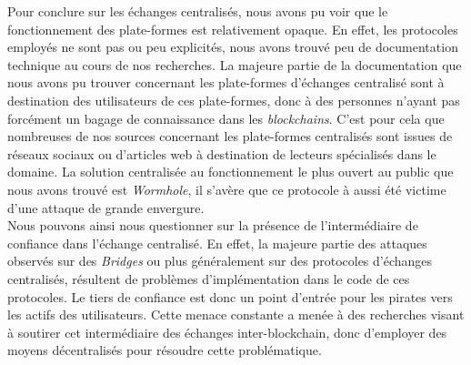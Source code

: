 Pour conclure sur les échanges centralisés, nous avons pu voir que le fonctionnement des plate-formes est relativement opaque. 
En effet, les protocoles employés ne sont pas ou peu explicités, nous avons trouvé peu de documentation technique au cours de nos recherches. 
La majeure partie de la documentation que nous avons pu trouver concernant les plate-formes d'échanges centralisé sont à destination des utilisateurs de ces plate-formes, donc à des personnes n'ayant pas forcément un bagage de connaissance dans les \textit{\gls{blockchain}s}. 
C'est pour cela que nombreuses de nos sources concernant les plate-formes centralisés sont issues de réseaux sociaux ou d'articles web à destination de lecteurs spécialisés dans le domaine. 
La solution centralisée au fonctionnement le plus ouvert au public que nous avons trouvé est \textit{\gls{Wormhole}}, il s'avère que ce protocole à aussi été victime d'une attaque de grande envergure. \\
Nous pouvons ainsi nous questionner sur la présence de l'intermédiaire de confiance dans l'échange centralisé. 
En effet, la majeure partie des attaques observés sur des \textit{Bridges} ou plus généralement sur des protocoles d'échanges centralisés, résultent de problèmes d'implémentation dans le code de ces protocoles. 
Le tiers de confiance est donc un point d'entrée pour les pirates vers les \gls{actif}s des utilisateurs. 
Cette menace constante a menée à des recherches visant à soutirer cet intermédiaire des échanges inter-\gls{blockchain}, donc d'employer des moyens décentralisés pour résoudre cette problématique. 